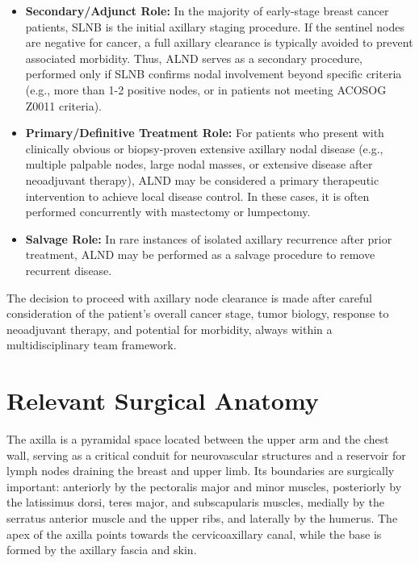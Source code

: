 \begin{itemize}
  \item \textbf{Secondary/Adjunct Role:} In the majority of early-stage breast cancer patients, SLNB is the initial axillary staging procedure. If the sentinel nodes are negative for cancer, a full axillary clearance is typically avoided to prevent associated morbidity. Thus, ALND serves as a secondary procedure, performed only if SLNB confirms nodal involvement beyond specific criteria (e.g., more than 1-2 positive nodes, or in patients not meeting ACOSOG Z0011 criteria).
  \item \textbf{Primary/Definitive Treatment Role:} For patients who present with clinically obvious or biopsy-proven extensive axillary nodal disease (e.g., multiple palpable nodes, large nodal masses, or extensive disease after neoadjuvant therapy), ALND may be considered a primary therapeutic intervention to achieve local disease control. In these cases, it is often performed concurrently with mastectomy or lumpectomy.
  \item \textbf{Salvage Role:} In rare instances of isolated axillary recurrence after prior treatment, ALND may be performed as a salvage procedure to remove recurrent disease.
\end{itemize}
The decision to proceed with axillary node clearance is made after careful consideration of the patient's overall cancer stage, tumor biology, response to neoadjuvant therapy, and potential for morbidity, always within a multidisciplinary team framework.

\section*{Relevant Surgical Anatomy}
The axilla is a pyramidal space located between the upper arm and the chest wall, serving as a critical conduit for neurovascular structures and a reservoir for lymph nodes draining the breast and upper limb. Its boundaries are surgically important: anteriorly by the pectoralis major and minor muscles, posteriorly by the latissimus dorsi, teres major, and subscapularis muscles, medially by the serratus anterior muscle and the upper ribs, and laterally by the humerus. The apex of the axilla points towards the cervicoaxillary canal, while the base is formed by the axillary fascia and skin.

